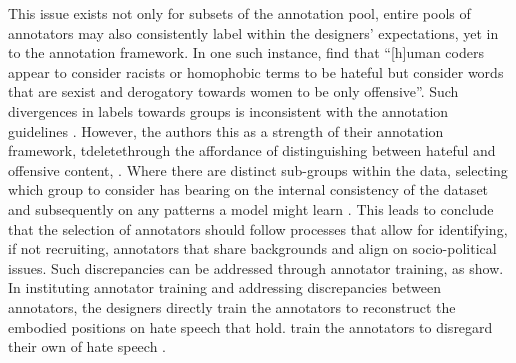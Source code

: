This issue exists not only for subsets of the annotation pool, entire pools of annotators may also consistently label within the designers' expectations, yet in  to the annotation framework.
In one such instance, \citet{Davidson:2017} find that ``[h]uman coders appear to consider racists or homophobic terms to be hateful but consider words that are sexist and derogatory towards women to be only offensive''.
Such divergences in labels towards groups is inconsistent with the annotation guidelines . 
However, the authors  this as a strength of their annotation framework, \tdelete{through the affordance of distinguishing} between hateful and offensive content, .
Where there are distinct sub-groups within the data, selecting which group to consider has bearing on the internal consistency of the dataset and subsequently on any patterns a model might learn \citep{Waseem:2016}.
This leads \citep{Waseem:2016} to conclude that the selection of annotators should follow processes that allow for identifying, if not recruiting, annotators that share backgrounds and align on socio-political issues.
Such discrepancies can  be addressed through annotator training, as \citet{Vidgen:2020} show.
In instituting annotator training and addressing discrepancies between annotators, the designers directly train the annotators to reconstruct the embodied positions on hate speech that  hold.
 train the annotators to disregard their own  of  hate speech .

